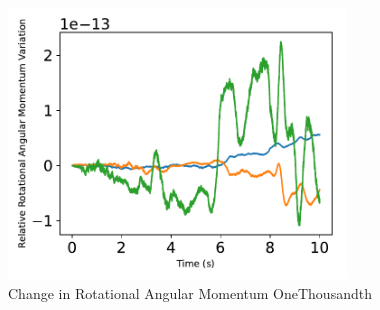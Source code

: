 \begin{figure}[htbp]\centerline{\includegraphics[width=0.8\textwidth]{AutoTeX/ChangeInRotationalAngularMomentumOneThousandth}}\caption{Change in Rotational Angular Momentum OneThousandth}\label{fig:ChangeInRotationalAngularMomentumOneThousandth}\end{figure}